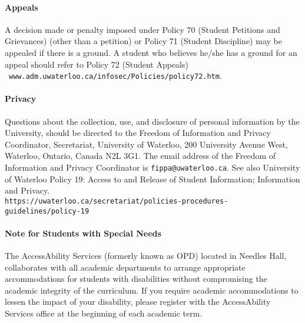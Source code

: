 \paragraph{Appeals}
A decision made or penalty imposed under Policy 70 (Student Petitions and Grievances) (other than a petition) or Policy 71 (Student Discipline) may be appealed if there is a ground. A student who believes he/she has a ground for an appeal should refer to Policy 72 (Student Appeals)\\~\texttt{www.adm.uwaterloo.ca/infosec/Policies/policy72.htm}.

\paragraph{Privacy}
Questions about the collection, use, and disclosure of personal information by the University, should be directed to the Freedom of Information and Privacy Coordinator, Secretariat, University of Waterloo, 200 University Avenue West, Waterloo, Ontario, Canada N2L 3G1. The email address of the Freedom of Information and Privacy Coordinator is \texttt{fippa@uwaterloo.ca}. See also University of Waterloo Policy 19: Access to and Release of Student Information; Information and Privacy.
\\ \texttt{https://uwaterloo.ca/secretariat/policies-procedures-guidelines/policy-19}

\paragraph{Note for Students with Special Needs}
The AccessAbility Services (formerly known as OPD) located in Needles Hall, collaborates with all academic departments to arrange appropriate accommodations for students with disabilities without compromising the academic integrity of the curriculum. If you require academic accommodations to lessen the impact of your disability, please register with the AccessAbility Services office at the beginning of each academic term.

